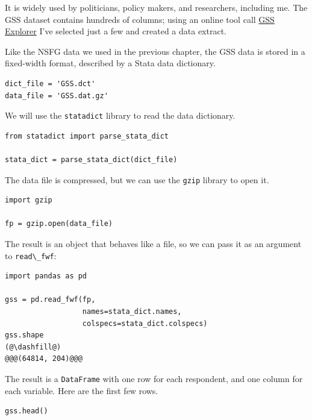 It is widely used by politicians, policy makers, and researchers,
including me. The GSS dataset contains hundreds of columns; using an
online tool call \href{https://gssdataexplorer.norc.org/}{GSS Explorer}
I've selected just a few and created a data extract.

Like the NSFG data we used in the previous chapter, the GSS data is
stored in a fixed-width format, described by a Stata data dictionary.

\begin{lstlisting}[]
dict_file = 'GSS.dct'
data_file = 'GSS.dat.gz'
\end{lstlisting}

We will use the \passthrough{\lstinline!statadict!} library to read the
data dictionary.

\begin{lstlisting}[]
from statadict import parse_stata_dict

stata_dict = parse_stata_dict(dict_file)
\end{lstlisting}

The data file is compressed, but we can use the
\passthrough{\lstinline!gzip!} library to open it.

\begin{lstlisting}[]
import gzip

fp = gzip.open(data_file)
\end{lstlisting}

The result is an object that behaves like a file, so we can pass it as
an argument to \passthrough{\lstinline!read\_fwf!}:

\begin{lstlisting}[]
import pandas as pd

gss = pd.read_fwf(fp, 
                  names=stata_dict.names, 
                  colspecs=stata_dict.colspecs)
gss.shape
(@\dashfill@)
@@@(64814, 204)@@@
\end{lstlisting}

The result is a \passthrough{\lstinline!DataFrame!} with one row for
each respondent, and one column for each variable. Here are the first
few rows.

\begin{lstlisting}[]
gss.head()
\end{lstlisting}

